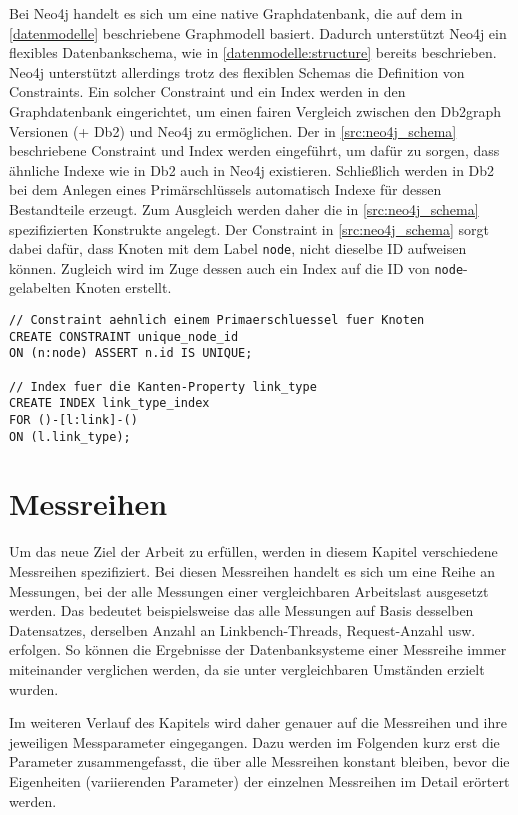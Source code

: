 Bei Neo4j handelt es sich um eine native Graphdatenbank, die auf dem in \autoref{datenmodelle} beschriebene Graphmodell basiert. Dadurch unterstützt Neo4j ein flexibles Datenbankschema, wie in \autoref{datenmodelle:structure} bereits beschrieben. Neo4j unterstützt allerdings trotz des flexiblen Schemas die Definition von Constraints. Ein solcher Constraint und ein Index werden in den Graphdatenbank eingerichtet, um einen fairen Vergleich zwischen den Db2graph Versionen (+ Db2) und Neo4j zu ermöglichen. Der in \autoref{src:neo4j_schema} beschriebene Constraint und Index werden eingeführt, um dafür zu sorgen, dass ähnliche Indexe wie in Db2 auch in Neo4j existieren. Schließlich werden in Db2 bei dem Anlegen eines Primärschlüssels automatisch Indexe für dessen Bestandteile erzeugt. Zum Ausgleich werden daher die in \autoref{src:neo4j_schema} spezifizierten Konstrukte angelegt. Der Constraint in \autoref{src:neo4j_schema} sorgt dabei dafür, dass Knoten mit dem Label \texttt{node}, nicht dieselbe ID aufweisen können. Zugleich wird im Zuge dessen auch ein Index auf die ID von \texttt{node}-gelabelten Knoten erstellt.

\begin{lstlisting}[label=src:neo4j_schema,caption={Neo4j Instanz Datenbankschema},language=CQL]
// Constraint aehnlich einem Primaerschluessel fuer Knoten
CREATE CONSTRAINT unique_node_id 
ON (n:node) ASSERT n.id IS UNIQUE;

// Index fuer die Kanten-Property link_type
CREATE INDEX link_type_index 
FOR ()-[l:link]-() 
ON (l.link_type);
\end{lstlisting}

\section{Messreihen}
\label{analyse:messreihen}
Um das neue Ziel der Arbeit zu erfüllen, werden in diesem Kapitel verschiedene Messreihen spezifiziert. Bei diesen Messreihen handelt es sich um eine Reihe an Messungen, bei der alle Messungen einer vergleichbaren Arbeitslast ausgesetzt werden. Das bedeutet beispielsweise das alle Messungen auf Basis desselben Datensatzes, derselben Anzahl an Linkbench-Threads, Request-Anzahl usw. erfolgen. So können die Ergebnisse der Datenbanksysteme einer Messreihe immer miteinander verglichen werden, da sie unter vergleichbaren Umständen erzielt wurden.

Im weiteren Verlauf des Kapitels wird daher genauer auf die Messreihen und ihre jeweiligen Messparameter eingegangen. Dazu werden im Folgenden kurz erst die Parameter zusammengefasst, die über alle Messreihen konstant bleiben, bevor die Eigenheiten (variierenden Parameter) der einzelnen Messreihen im Detail erörtert werden.  


